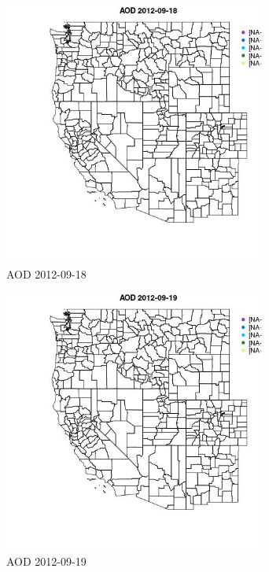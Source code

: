 \begin{figure} 
\centering  
\includegraphics[width=0.77\textwidth]{Code_Outputs/ML_input_report_ML_input_PM25_Step5_part_d_de_duplicated_aves_ML_input_MapObsAOD2012-09-18.jpg} 
\caption{\label{fig:ML_input_report_ML_input_PM25_Step5_part_d_de_duplicated_aves_ML_inputMapObsAOD2012-09-18}AOD 2012-09-18} 
\end{figure} 
 

\clearpage 

\begin{figure} 
\centering  
\includegraphics[width=0.77\textwidth]{Code_Outputs/ML_input_report_ML_input_PM25_Step5_part_d_de_duplicated_aves_ML_input_MapObsAOD2012-09-19.jpg} 
\caption{\label{fig:ML_input_report_ML_input_PM25_Step5_part_d_de_duplicated_aves_ML_inputMapObsAOD2012-09-19}AOD 2012-09-19} 
\end{figure} 
 

